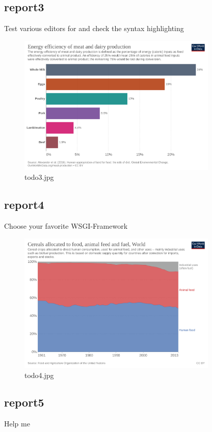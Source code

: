\documentclass{article}%
\begin{document}
%
\FloatBarrier

%
\subsection{report3}%
\label{subsec:report3}%
Test various editors for and check the syntax highlighting%


\begin{figure}[htb!]%
\centering%
\includegraphics[width=360px]{todo3.jpg}%
\caption{todo3.jpg}%
\end{figure}

%
\FloatBarrier

%
\subsection{report4}%
\label{subsec:report4}%
Choose your favorite WSGI{-}Framework%


\begin{figure}[htb!]%
\centering%
\includegraphics[width=360px]{todo4.jpg}%
\caption{todo4.jpg}%
\end{figure}

%
\FloatBarrier

%
\subsection{report5}%
\label{subsec:report5}%
Help me%
\end{document}
